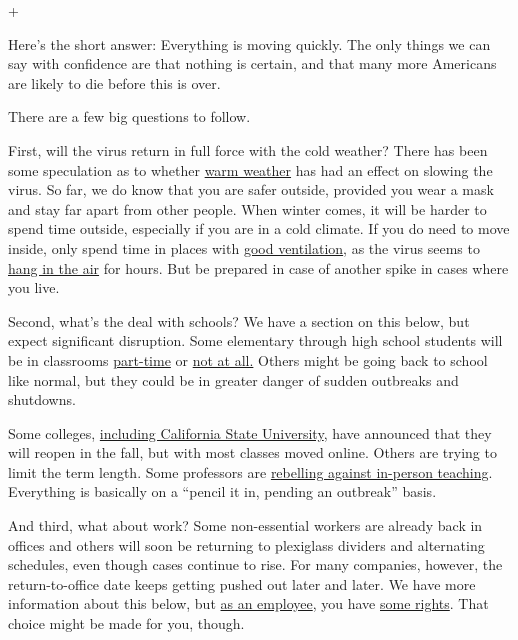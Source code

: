 +

Here's the short answer: Everything is moving quickly. The only things
we can say with confidence are that nothing is certain, and that many
more Americans are likely to die before this is over.

There are a few big questions to follow.

First, will the virus return in full force with the cold weather? There
has been some speculation as to whether
\href{https://www.nytimes.com/2020/03/22/health/warm-weather-coronavirus.html}{warm
weather} has had an effect on slowing the virus. So far, we do know that
you are safer outside, provided you wear a mask and stay far apart from
other people. When winter comes, it will be harder to spend time
outside, especially if you are in a cold climate. If you do need to move
inside, only spend time in places with
\href{https://www.nytimes.com/2020/07/06/health/coronavirus-airborne-aerosols.html}{good
ventilation}, as the virus seems to
\href{https://www.nytimes.com/2020/07/04/health/239-experts-with-one-big-claim-the-coronavirus-is-airborne.html}{hang
in the air} for hours. But be prepared in case of another spike in cases
where you live.

Second, what's the deal with schools? We have a section on this below,
but expect significant disruption. Some elementary through high school
students will be in classrooms
\href{https://www.nytimes.com/2020/06/26/us/coronavirus-schools-reopen-fall.html}{part-time}
or
\href{https://www.nytimes.com/2020/07/13/us/lausd-san-diego-school-reopening.html}{not
at all.} Others might be going back to school like normal, but they
could be in greater danger of sudden outbreaks and shutdowns.

Some colleges,
\href{https://www.nytimes.com/2020/05/12/us/cal-state-online-classes.html}{including
California State University}, have announced that they will reopen in
the fall, but with most classes moved online. Others are trying to limit
the term length. Some professors are
\href{https://www.nytimes.com/2020/07/03/us/coronavirus-college-professors.html}{rebelling
against in-person teaching}. Everything is basically on a ``pencil it
in, pending an outbreak'' basis.

And third, what about work? Some non-essential workers are already back
in offices and others will soon be returning to plexiglass dividers and
alternating schedules, even though cases continue to rise. For many
companies, however, the return-to-office date keeps getting pushed out
later and later. We have more information about this below, but
\href{https://www.cdc.gov/coronavirus/2019-ncov/community/guidance-business-response.html}{as
an employee}, you have
\href{https://www.osha.gov/SLTC/covid-19/standards.html}{some rights}.
That choice might be made for you, though.

